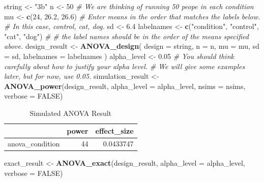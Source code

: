\documentclass[]{book}
\newenvironment{Shaded}{\begin{snugshade}}{\end{snugshade}}
\newcommand{\CommentTok}[1]{\textcolor[rgb]{0.56,0.35,0.01}{\textit{#1}}}
\newcommand{\DataTypeTok}[1]{\textcolor[rgb]{0.13,0.29,0.53}{#1}}
\newcommand{\DecValTok}[1]{\textcolor[rgb]{0.00,0.00,0.81}{#1}}
\newcommand{\FloatTok}[1]{\textcolor[rgb]{0.00,0.00,0.81}{#1}}
\newcommand{\KeywordTok}[1]{\textcolor[rgb]{0.13,0.29,0.53}{\textbf{#1}}}
\newcommand{\NormalTok}[1]{#1}
\newcommand{\OtherTok}[1]{\textcolor[rgb]{0.56,0.35,0.01}{#1}}
\newcommand{\StringTok}[1]{\textcolor[rgb]{0.31,0.60,0.02}{#1}}
\begin{document}
\begin{Shaded}
\begin{Highlighting}[]
\NormalTok{string <-}\StringTok{ "3b"}
\NormalTok{n <-}\StringTok{ }\DecValTok{50}
\CommentTok{# We are thinking of running 50 peope in each condition}
\NormalTok{mu <-}\StringTok{ }\KeywordTok{c}\NormalTok{(}\DecValTok{24}\NormalTok{, }\FloatTok{26.2}\NormalTok{, }\FloatTok{26.6}\NormalTok{)}
\CommentTok{# Enter means in the order that matches the labels below.}
\CommentTok{# In this case, control, cat, dog.}
\NormalTok{sd <-}\StringTok{ }\FloatTok{6.4}
\NormalTok{labelnames <-}\StringTok{ }\KeywordTok{c}\NormalTok{(}\StringTok{"condition"}\NormalTok{, }\StringTok{"control"}\NormalTok{, }\StringTok{"cat"}\NormalTok{, }\StringTok{"dog"}\NormalTok{) }\CommentTok{#}
\CommentTok{# the label names should be in the order of the means specified above.}
\NormalTok{design_result <-}\StringTok{ }\KeywordTok{ANOVA_design}\NormalTok{(}
\DataTypeTok{design =}\NormalTok{ string,}
\DataTypeTok{n =}\NormalTok{ n,}
\DataTypeTok{mu =}\NormalTok{ mu,}
\DataTypeTok{sd =}\NormalTok{ sd,}
\DataTypeTok{labelnames =}\NormalTok{ labelnames}
\NormalTok{)}
\NormalTok{alpha_level <-}\StringTok{ }\FloatTok{0.05}
\CommentTok{# You should think carefully about how to justify your alpha level.}
\CommentTok{# We will give some examples later, but for now, use 0.05.}
\NormalTok{simulation_result <-}\StringTok{ }\KeywordTok{ANOVA_power}\NormalTok{(design_result, }
                                 \DataTypeTok{alpha_level =}\NormalTok{ alpha_level, }
                                 \DataTypeTok{nsims =}\NormalTok{ nsims,}
                                 \DataTypeTok{verbose =} \OtherTok{FALSE}\NormalTok{)}
\end{Highlighting}
\end{Shaded}

\begin{table}[t]

\caption{\label{tab:unnamed-chunk-27}Simulated ANOVA Result}
\centering
\begin{tabular}{l|r|r}
\hline
  & power & effect\_size\\
\hline
anova\_condition & 44 & 0.0433747\\
\hline
\end{tabular}
\end{table}

\begin{Shaded}
\begin{Highlighting}[]
\NormalTok{exact_result <-}\StringTok{ }\KeywordTok{ANOVA_exact}\NormalTok{(design_result,}
                            \DataTypeTok{alpha_level =}\NormalTok{ alpha_level,}
                            \DataTypeTok{verbose =} \OtherTok{FALSE}\NormalTok{)}
\end{Highlighting}
\end{Shaded}
\end{document}
